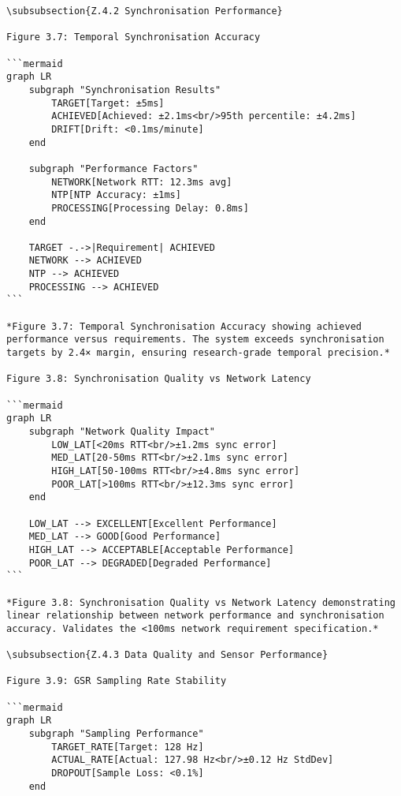 \begin{verbatim}
\subsubsection{Z.4.2 Synchronisation Performance}

Figure 3.7: Temporal Synchronisation Accuracy

```mermaid
graph LR
    subgraph "Synchronisation Results"
        TARGET[Target: ±5ms]
        ACHIEVED[Achieved: ±2.1ms<br/>95th percentile: ±4.2ms]
        DRIFT[Drift: <0.1ms/minute]
    end

    subgraph "Performance Factors"
        NETWORK[Network RTT: 12.3ms avg]
        NTP[NTP Accuracy: ±1ms]
        PROCESSING[Processing Delay: 0.8ms]
    end

    TARGET -.->|Requirement| ACHIEVED
    NETWORK --> ACHIEVED
    NTP --> ACHIEVED
    PROCESSING --> ACHIEVED
```

*Figure 3.7: Temporal Synchronisation Accuracy showing achieved
performance versus requirements. The system exceeds synchronisation
targets by 2.4× margin, ensuring research-grade temporal precision.*

Figure 3.8: Synchronisation Quality vs Network Latency

```mermaid
graph LR
    subgraph "Network Quality Impact"
        LOW_LAT[<20ms RTT<br/>±1.2ms sync error]
        MED_LAT[20-50ms RTT<br/>±2.1ms sync error]
        HIGH_LAT[50-100ms RTT<br/>±4.8ms sync error]
        POOR_LAT[>100ms RTT<br/>±12.3ms sync error]
    end

    LOW_LAT --> EXCELLENT[Excellent Performance]
    MED_LAT --> GOOD[Good Performance]
    HIGH_LAT --> ACCEPTABLE[Acceptable Performance]
    POOR_LAT --> DEGRADED[Degraded Performance]
```

*Figure 3.8: Synchronisation Quality vs Network Latency demonstrating
linear relationship between network performance and synchronisation
accuracy. Validates the <100ms network requirement specification.*

\subsubsection{Z.4.3 Data Quality and Sensor Performance}

Figure 3.9: GSR Sampling Rate Stability

```mermaid
graph LR
    subgraph "Sampling Performance"
        TARGET_RATE[Target: 128 Hz]
        ACTUAL_RATE[Actual: 127.98 Hz<br/>±0.12 Hz StdDev]
        DROPOUT[Sample Loss: <0.1%]
    end


\end{verbatim}
